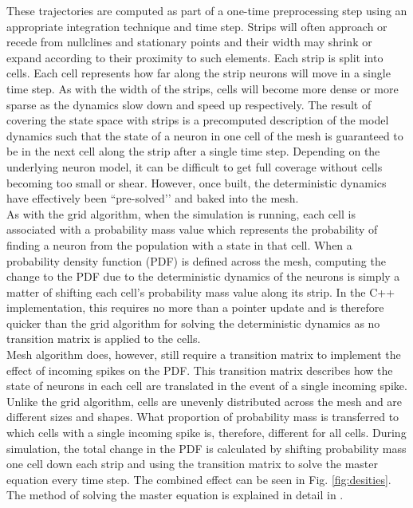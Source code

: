 \documentclass[utf8]{frontiersSCNS} %
\begin{document}
These trajectories are computed as part of a one-time preprocessing step using an appropriate integration technique and time step. Strips will often approach or recede from nullclines and stationary points and their width may shrink or expand according to their proximity to such elements. Each strip is split into cells. Each cell represents how far along the strip neurons will move in a single time step. As with the width of the strips, cells will become more dense or more sparse as the dynamics slow down and speed up respectively. The result of covering the state space with strips is a precomputed description of the model dynamics such that the state of a neuron in one cell of the mesh is guaranteed to be in the next cell along the strip after a single time step. Depending on the underlying neuron model, it can be difficult to get full coverage without cells becoming too small or shear. However, once built, the deterministic dynamics have effectively been ``pre-solved’’ and baked into the mesh.\\

As with the grid algorithm, when the simulation is running, each cell is associated with a probability mass value which represents the probability of finding a neuron from the population with a state in that cell. When a probability density function (PDF) is defined across the mesh, computing the change to the PDF due to the deterministic dynamics of the neurons is simply a matter of shifting each cell's probability mass value along its strip. In the C++ implementation, this requires no more than a pointer update and is therefore quicker than the grid algorithm for solving the deterministic dynamics as no transition matrix is applied to the cells.\\

Mesh algorithm does, however, still require a transition matrix to implement the effect of incoming spikes on the PDF. This transition matrix describes how the state of neurons in each cell are translated in the event of a single incoming spike. Unlike the grid algorithm, cells are unevenly distributed across the mesh and are different sizes and shapes. What proportion of probability mass is transferred to which cells with a single incoming spike is, therefore, different for all cells. During simulation, the total change in the PDF is calculated by shifting probability mass one cell down each strip and using the transition matrix to solve the master equation every time step. The combined effect can be seen in Fig. \ref{fig:desities}. The method of solving the master equation is explained in detail in \cite{de2013generic}.\\
\end{document}
